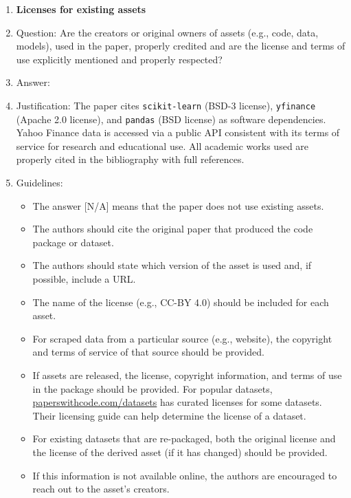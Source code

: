\documentclass{article}
\begin{document}
\begin{enumerate}
\item {\bf Licenses for existing assets}
    \item[] Question: Are the creators or original owners of assets (e.g., code, data, models), used in
the paper, properly credited and are the license and terms of use explicitly mentioned and
properly respected?
    \item[] Answer: \answerYes{}
    \item[] Justification: The paper cites \texttt{scikit-learn} (BSD-3 license), \texttt{yfinance}
    (Apache 2.0 license), and \texttt{pandas} (BSD license) as software dependencies. Yahoo
    Finance data is accessed via a public API consistent with its terms of service for research
    and educational use. All academic works used are properly cited in the bibliography with
    full references.
    \item[] Guidelines:
    \begin{itemize}
        \item The answer [N/A] means that the paper does not use existing assets.
        \item The authors should cite the original paper that produced the code package or dataset.
        \item The authors should state which version of the asset is used and, if possible, include a
URL.
        \item The name of the license (e.g., CC-BY 4.0) should be included for each asset.
        \item For scraped data from a particular source (e.g., website), the copyright and terms of
service of that source should be provided.
        \item If assets are released, the license, copyright information, and terms of use in the
package should be provided. For popular datasets, \url{paperswithcode.com/datasets}
has curated licenses for some datasets. Their licensing guide can help determine the
license of a dataset.
        \item For existing datasets that are re-packaged, both the original license and the license of
the derived asset (if it has changed) should be provided.
        \item If this information is not available online, the authors are encouraged to reach out to
the asset's creators.
    \end{itemize}


\end{enumerate}
\end{document}
